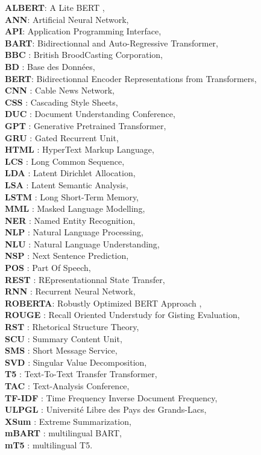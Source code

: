 \textbf{ALBERT}: A Lite BERT ,\\
\textbf{ANN}: Artificial Neural Network,\\
\textbf{API}: Application Programming Interface,\\
\textbf{BART}: Bidirectionnal and Auto-Regressive Transformer,\\
\textbf{BBC} : British BroodCasting Corporation,\\
\textbf{BD} : Base des Données,\\
\textbf{BERT}: Bidirectionnal Encoder Representations from Transformers,\\
\textbf{CNN} : Cable News Network,\\
\textbf{CSS} : Cascading Style Sheets,\\
\textbf{DUC} : Document Understanding Conference,\\
\textbf{GPT} : Generative Pretrained Transformer,\\
\textbf{GRU} : Gated Recurrent Unit,\\
\textbf{HTML} : HyperText Markup Language,\\
\textbf{LCS} : Long Common Sequence,\\
\textbf{LDA} : Latent Dirichlet Allocation,\\
\textbf{LSA} : Latent Semantic Analysis,\\
\textbf{LSTM} : Long Short-Term Memory,\\
\textbf{MML} : Masked Language Modelling,\\
\textbf{NER} : Named Entity Recognition,\\
\textbf{NLP} : Natural Language Processing,\\
\textbf{NLU} : Natural Language Understanding,\\
\textbf{NSP} : Next Sentence Prediction,\\
\textbf{POS} : Part Of Speech,\\
\textbf{REST} : REpresentationnal State Transfer,\\
\textbf{RNN} : Recurrent Neural Network,\\
\textbf{ROBERTA}: Robustly Optimized BERT Approach ,\\
\textbf{ROUGE} : Recall Oriented Understudy for Gisting Evaluation,\\
\textbf{RST} : Rhetorical Structure Theory,\\
\textbf{SCU} : Summary Content Unit,\\
\textbf{SMS} : Short Message Service,\\
\textbf{SVD} : Singular Value Decomposition,\\
\textbf{T5} : Text-To-Text Transfer Transformer,\\
\textbf{TAC} : Text-Analysis Conference,\\
\textbf{TF-IDF} : Time Frequency Inverse Document Frequency,\\
\textbf{ULPGL} : Université Libre des Pays des Grands-Lacs,\\
\textbf{XSum} : Extreme Summarization,\\
\textbf{mBART} : multilingual BART,\\
\textbf{mT5} : multilingual T5.